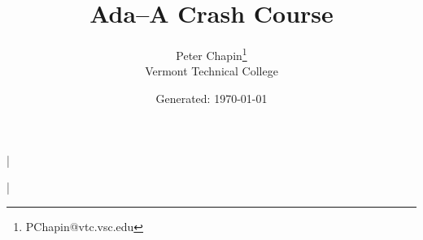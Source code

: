 \documentclass{scrreprt}
\begin{document}
\titlehead{\centering\texttt{[image: Ada-Mascot.pdf]}}
\title{Ada--A Crash Course}
\author{Peter Chapin\thanks{PChapin@vtc.vsc.edu}\\
  Vermont Technical College}
\date{Generated: \today}
\maketitle

\tableofcontents

\lstMakeShortInline|




\lstDeleteShortInline|

%
%
%
%
%



\end{document}
